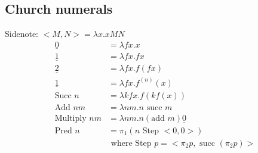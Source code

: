 \documentclass{article}
\begin{document}
\subsection{Church numerals}
Sidenote: $ <M, N> = \lambda x .xMN$
\begin{align*}
\underline{0}&=\lambda fx.x\\
\underline{1}&=\lambda fx.fx\\
\underline{2}&=\lambda fx.f(fx)\\
\underline{1}&=\lambda fx.f^{(n)}(x)\\
\text{Succ } n &=\lambda kfx.f(kf(x))\\
\text{Add } n m&=\lambda nm. n \text{ succ }m\\
\text{Multiply } n m&=\lambda nm. n (\text{add } m) \underline{0}\\
\text{Pred } n&=\pi_1(n\text{ Step }<0,0>)\\
&\text{ where Step } p= <\pi_2p, \text{ succ }(\pi_2p)>
\end{align*}
\end{document}
